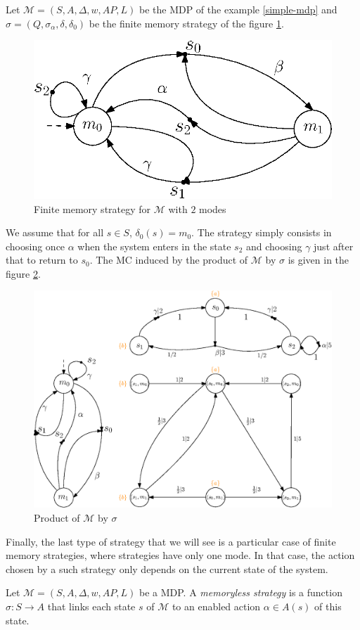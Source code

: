 \begin{example}
  Let $\mathcal{M}=(S, A, \Delta, w, AP, L)$ be the MDP of the example \ref{simple-mdp} and $\sigma = (Q, \sigma_\alpha, \delta, \delta_0)$ be the
  finite memory strategy of the figure \ref{finite_mem_strat}.
  \begin{figure}[h!]
    \centering
    \includegraphics[width=0.4\linewidth]{resources/strategy}
    \caption{Finite memory strategy for $\mathcal{M}$ with $2$ modes}\label{finite_mem_strat}
  \end{figure}

  We assume that for all $s \in S$, $\delta_0(s) = m_0$. The strategy simply consists in choosing once $\alpha$ when the system enters in the state $s_2$ and choosing $\gamma$ just after that to return to $s_0$. The MC induced by the product of $\mathcal{M}$ by $\sigma$ is given in the figure
  \ref{inducedMC}.
  \begin{figure}[H]
    \centering
    \includegraphics[width=0.55\linewidth]{resources/inductedmarkov}
    \caption{Product of $\mathcal{M}$ by $\sigma$}\label{inducedMC}
  \end{figure}
\end{example}

Finally, the last type of strategy that we will see is a particular case of finite memory strategies, where strategies have only one mode.
In that case, the action chosen by a such strategy only depends on the current state of the system.

\begin{definition}
  Let $\mathcal{M}=(S, A, \Delta, w, AP, L)$ be a MDP. A \textit{memoryless strategy} is a function
  $
    \sigma: S \rightarrow A
  $ that links each state $s$ of $\mathcal{M}$ to an enabled action $\alpha \in A(s)$ of this state.
\end{definition}

